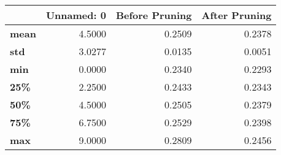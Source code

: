 \begin{tabular}{lrrr}
\toprule
{} &  Unnamed: 0 &  Before Pruning &  After Pruning \\
\midrule
\textbf{mean} &      4.5000 &          0.2509 &         0.2378 \\
\textbf{std } &      3.0277 &          0.0135 &         0.0051 \\
\textbf{min } &      0.0000 &          0.2340 &         0.2293 \\
\textbf{25\% } &      2.2500 &          0.2433 &         0.2343 \\
\textbf{50\% } &      4.5000 &          0.2505 &         0.2379 \\
\textbf{75\% } &      6.7500 &          0.2529 &         0.2398 \\
\textbf{max } &      9.0000 &          0.2809 &         0.2456 \\
\bottomrule
\end{tabular}
